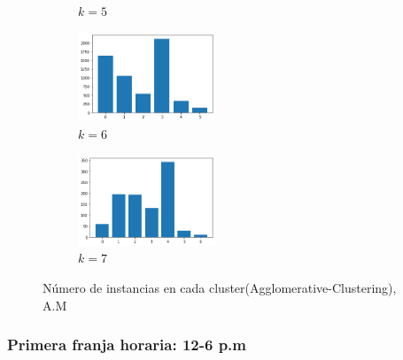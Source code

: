 \begin{figure}[H]
\begin{subfigure}{.5\textwidth}
  \caption{$k=5$}
\end{subfigure}
\begin{subfigure}{.5\textwidth}
  \centering
  \includegraphics[width=0.45\textwidth]{imagenes/counter/am/agg6.png}
  \caption{$k=6$}
\end{subfigure}
\begin{subfigure}{.5\textwidth}
  \centering
  \includegraphics[width=0.45\textwidth]{imagenes/counter/am/agg7.png}
  \caption{$k=7$}
\end{subfigure}
\caption{Número de instancias en cada cluster(Agglomerative-Clustering), A.M}
\label{fig:hm-km}
\end{figure}


\subsubsection{Primera franja horaria: 12-6 p.m}

